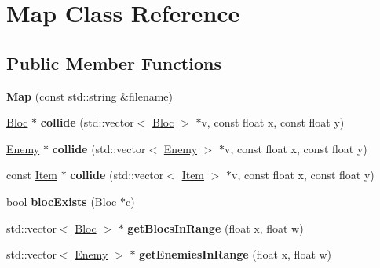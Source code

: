\hypertarget{class_map}{}\section{Map Class Reference}
\label{class_map}
\subsection*{Public Member Functions}
\begin{DoxyCompactItemize}
\item 
\mbox{\label{class_map_a871049c7b391e75039ccba5a4d757dae}} 
{\bfseries Map} (const std\+::string \&filename)
\item 
\mbox{\label{class_map_ab3015fbbe52c9d7aac4de6ccfbe284ff}} 
\hyperlink{class_bloc}{Bloc} $\ast$ {\bfseries collide} (std\+::vector$<$ \hyperlink{class_bloc}{Bloc} $>$ $\ast$v, const float x, const float y)
\item 
\mbox{\label{class_map_a438e13105ce6dd292313b40d45200d36}} 
\hyperlink{class_enemy}{Enemy} $\ast$ {\bfseries collide} (std\+::vector$<$ \hyperlink{class_enemy}{Enemy} $>$ $\ast$v, const float x, const float y)
\item 
\mbox{\label{class_map_af0dad50e330f19d9f1d8adb6909add92}} 
const \hyperlink{class_item}{Item} $\ast$ {\bfseries collide} (std\+::vector$<$ \hyperlink{class_item}{Item} $>$ $\ast$v, const float x, const float y)
\item 
\mbox{\label{class_map_a6f49044f90ae658a070a8e5b6bdd67d0}} 
bool {\bfseries bloc\+Exists} (\hyperlink{class_bloc}{Bloc} $\ast$c)
\item 
\mbox{\label{class_map_ae42653fb8c0ce554090df9b520dcc6a1}} 
std\+::vector$<$ \hyperlink{class_bloc}{Bloc} $>$ $\ast$ {\bfseries get\+Blocs\+In\+Range} (float x, float w)
\item 
\mbox{\label{class_map_addc796dab4fe8fb33edbaddd7dd71842}} 
std\+::vector$<$ \hyperlink{class_enemy}{Enemy} $>$ $\ast$ {\bfseries get\+Enemies\+In\+Range} (float x, float w)
\item 
\mbox{\label{class_map_af4f4a944bb3700983e0892d6dc6aa9cb}} 

\end{DoxyCompactItemize}
